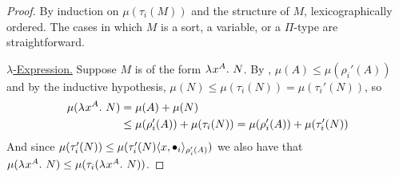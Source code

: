 \documentclass{article}
\begin{document}
\begin{proof}
By induction on $\mu(\tau_i(M))$ and the structure of $M$, lexicographically ordered.
The cases in which $M$ is a sort, a variable, or a $\Pi$-type are straightforward.

\noindent\underline{$\lambda$-Expression.}
Suppose $M$ is of the form $\lambdaT x A N$.
By , $\mu(A) \leq \mu(\rho_i'(A))$ and by the inductive hypothesis, $\mu(N) \leq \mu(\tau_i(N)) = \mu(\tau_i'(N))$, so
\begin{align*}
\mu(\lambdaT x A N) &=
\mu(A) + \mu(N) \\ &\leq
\mu(\rho_i'(A)) + \mu(\tau_i(N)) = \mu(\rho_i'(A)) + \mu(\tau_i'(N))
\end{align*}
And since $\mu(\tau_i'(N)) \leq \mu(\tau_i'(N)\pair[\rho_i'(A)] x {\bullet_i})$ we also have that $\mu(\lambdaT x A N) \leq \mu(\tau_i(\lambdaT x A N))$.


\end{proof}
\end{document}
